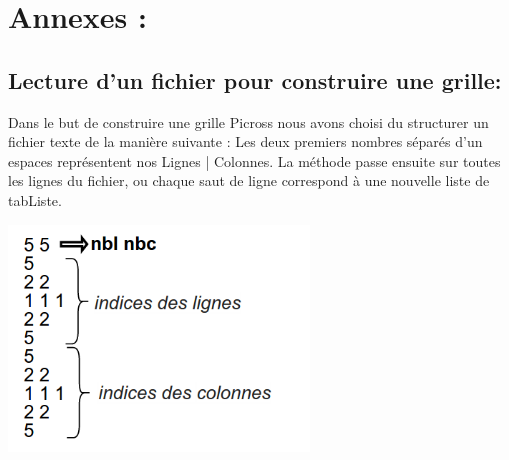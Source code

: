 \documentclass{article}
\begin{document}
\section{Annexes :}
\subsection{Lecture d'un fichier pour construire une grille:}
Dans le but de construire une grille Picross nous avons choisi du structurer un fichier texte de la manière suivante :\newline
Les deux premiers nombres séparés d'un espaces représentent nos Lignes | Colonnes.
La méthode passe ensuite sur toutes les lignes du fichier, ou chaque saut de ligne correspond à une nouvelle liste de tabListe.
\begin{center}
\includegraphics[width=8cm]{ex2}
\end{center}
\end{document}

